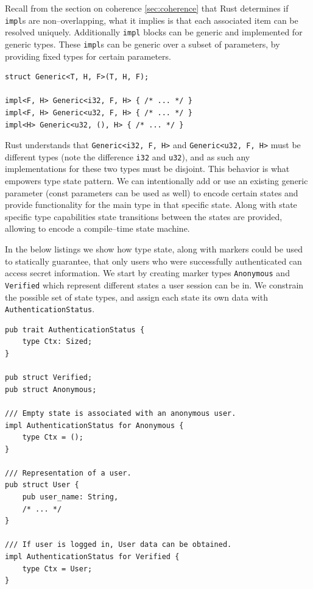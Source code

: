Recall from the section on coherence \ref{sec:coherence} that Rust determines if \texttt{impl}s are non--overlapping, what it implies is that each associated item can be resolved uniquely.
Additionally \texttt{impl} blocks can be generic and implemented for generic types. These \texttt{impl}s can be generic over a subset of parameters, 
by providing fixed types for certain parameters.

\begin{lstlisting}
struct Generic<T, H, F>(T, H, F);

impl<F, H> Generic<i32, F, H> { /* ... */ }
impl<F, H> Generic<u32, F, H> { /* ... */ }
impl<H> Generic<u32, (), H> { /* ... */ }
\end{lstlisting}

Rust understands that \texttt{Generic<i32, F, H>} and \texttt{Generic<u32, F, H>} must be different types (note the difference \texttt{i32} and \texttt{u32}),
and as such any implementations for these two types must be disjoint.
This behavior is what empowers type state pattern. We can intentionally add or use an existing generic parameter (const parameters can be used as well)
to encode certain states and provide functionality for the main type in that specific state. Along with state specific type capabilities state transitions between the states are provided,
allowing to encode a compile--time state machine.

In the below listings we show how type state, along with markers could be used to statically guarantee, that only users who were successfully authenticated
can access secret information. We start by creating marker types \texttt{Anonymous} and \texttt{Verified} which represent different states a user session can be in.
We constrain the possible set of state types, and assign each state its own data with \texttt{AuthenticationStatus}.

\begin{lstlisting}
pub trait AuthenticationStatus {
    type Ctx: Sized;
}

pub struct Verified;
pub struct Anonymous;

/// Empty state is associated with an anonymous user.
impl AuthenticationStatus for Anonymous {
    type Ctx = ();
}

/// Representation of a user.
pub struct User {
    pub user_name: String,
    /* ... */
}

/// If user is logged in, User data can be obtained.
impl AuthenticationStatus for Verified {
    type Ctx = User;
}
\end{lstlisting}

